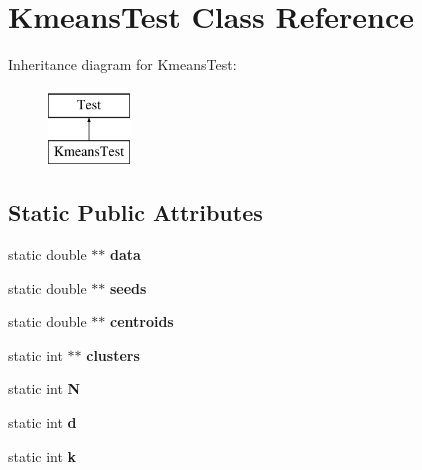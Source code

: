 \hypertarget{classKmeansTest}{\section{Kmeans\-Test Class Reference}
\label{classKmeansTest}
}
Inheritance diagram for Kmeans\-Test\-:\begin{figure}[H]
\begin{center}
\leavevmode
\includegraphics[height=2.000000cm]{classKmeansTest}
\end{center}
\end{figure}
\subsection*{Static Public Attributes}
\begin{DoxyCompactItemize}
\item 
\hypertarget{classKmeansTest_ac49bc85d7f0c6573fdb41291fcad7ea8}{static double $\ast$$\ast$ {\bfseries data}}\label{classKmeansTest_ac49bc85d7f0c6573fdb41291fcad7ea8}

\item 
\hypertarget{classKmeansTest_a02a49c0447e8979c5e42e80798f1909d}{static double $\ast$$\ast$ {\bfseries seeds}}\label{classKmeansTest_a02a49c0447e8979c5e42e80798f1909d}

\item 
\hypertarget{classKmeansTest_ad1d5e54851950f37170c362518fc5aef}{static double $\ast$$\ast$ {\bfseries centroids}}\label{classKmeansTest_ad1d5e54851950f37170c362518fc5aef}

\item 
\hypertarget{classKmeansTest_a5d95633358ac5a6633cdfaf902978203}{static int $\ast$$\ast$ {\bfseries clusters}}\label{classKmeansTest_a5d95633358ac5a6633cdfaf902978203}

\item 
\hypertarget{classKmeansTest_a881736055281c3d2d5f161a57f37b810}{static int {\bfseries N}}\label{classKmeansTest_a881736055281c3d2d5f161a57f37b810}

\item 
\hypertarget{classKmeansTest_a08d592368c02b1aabe71c26b34796bf6}{static int {\bfseries d}}\label{classKmeansTest_a08d592368c02b1aabe71c26b34796bf6}

\item 
\hypertarget{classKmeansTest_a044e6c5eff9a1a3ddb542771c226bd7b}{static int {\bfseries k}}\label{classKmeansTest_a044e6c5eff9a1a3ddb542771c226bd7b}

\end{DoxyCompactItemize}
